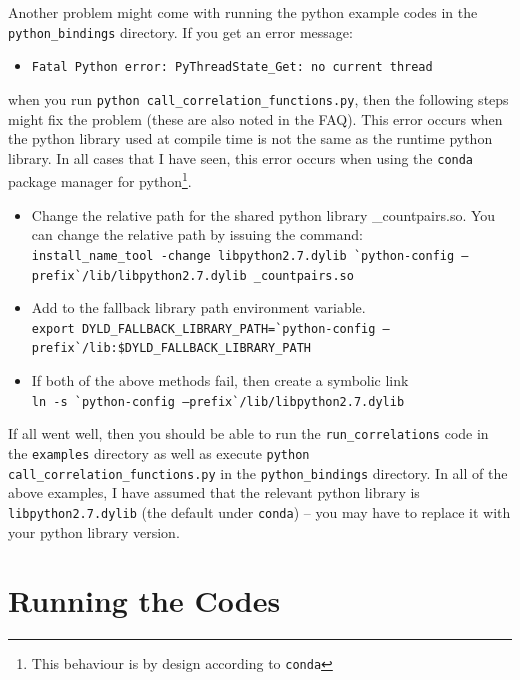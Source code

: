 \documentclass[12pt,titlepage]{article}
\let\stdsection\section
\renewcommand\section{\newpage\stdsection}
\begin{document}
Another problem might come with running the python example codes in the \texttt{python\_bindings} directory. If you get an error message:
\begin{itemize} 
\item \texttt{Fatal Python error: PyThreadState\_Get: no current thread} 
\end{itemize}
when you run \texttt{python call\_correlation\_functions.py}, then the following 
steps might fix the problem (these are also noted in the FAQ). This error occurs when the python library used at compile time is not the same 
as the runtime python library. In all cases that I have seen, this error occurs when using the \texttt{conda} package manager for python\footnote{This 
behaviour is by design according to \texttt{conda}}. 
\begin{itemize}

\item Change the relative path for the shared python library \_countpairs.so. You can change the relative path by issuing the command: \\
{\scriptsize\texttt{install\_name\_tool -change libpython2.7.dylib  \`{}python-config --prefix\`{}/lib/libpython2.7.dylib \_countpairs.so}}

\item Add to the fallback library path environment variable. \\
{\scriptsize\texttt{export DYLD\_FALLBACK\_LIBRARY\_PATH=\`{}python-config --prefix\`{}/lib:\$DYLD\_FALLBACK\_LIBRARY\_PATH}}

\item If both of the above methods fail, then create a symbolic link \\
{\scriptsize\texttt{ln -s \`{}python-config --prefix\`{}/lib/libpython2.7.dylib}}
\end{itemize}
If all went well, then you should be able to run the \texttt{run\_correlations} code in the \texttt{examples} directory as well as execute \texttt{python call\_correlation\_functions.py} 
in the \texttt{python\_bindings} directory. In all of the above examples, I have assumed that the relevant python library is \texttt{libpython2.7.dylib} (the default 
under \texttt{conda}) -- you may have to replace it with your python library version.

\section{Running the Codes}
\end{document}
